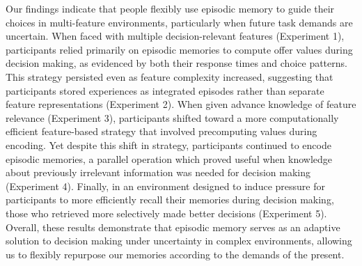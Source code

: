\documentclass[10pt,letterpaper]{article}
\begin{document}
Our findings indicate that people flexibly use episodic memory to guide their choices in multi-feature environments, particularly when future task demands are uncertain. When faced with multiple decision-relevant features (Experiment 1), participants relied primarily on episodic memories to compute offer values during decision making, as evidenced by both their response times and choice patterns. This strategy persisted even as feature complexity increased, suggesting that participants stored experiences as integrated episodes rather than separate feature representations (Experiment 2). When given advance knowledge of feature relevance (Experiment 3), participants shifted toward a more computationally efficient feature-based strategy that involved precomputing values during encoding. Yet despite this shift in strategy, participants continued to encode episodic memories, a parallel operation which proved useful when knowledge about previously irrelevant information was needed for decision making (Experiment 4). Finally, in an environment designed to induce pressure for participants to more efficiently recall their memories during decision making, those who retrieved more selectively made better decisions (Experiment 5). Overall, these results demonstrate that episodic memory serves as an adaptive solution to decision making under uncertainty in complex environments, allowing us to flexibly repurpose our memories according to the demands of the present.
\end{document}
